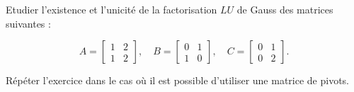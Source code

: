 Etudier l'existence et l'unicité de la factorisation $LU$ de Gauss des matrices suivantes :

\begin{equation*}
  A = \begin{bmatrix}
        1 & 2   \\
        1 & 2
      \end{bmatrix}
  , \quad
  B = \begin{bmatrix}
        0 & 1   \\
        1 & 0
      \end{bmatrix}
  , \quad
  C = \begin{bmatrix}
        0 & 1   \\
        0 & 2
      \end{bmatrix}
  .
\end{equation*}

Répéter l'exercice dans le cas où il est possible d'utiliser une matrice de pivots.